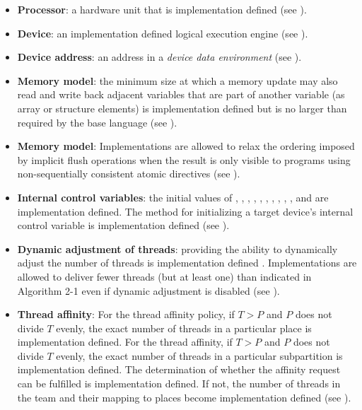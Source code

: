 \begin{itemize}
\item \textbf{Processor}: a hardware unit that is implementation defined (see 
). 

\item \textbf{Device}: an implementation defined logical execution engine (see 
). 

\item \textbf{Device address}: an address in a \emph{device data environment} (see ).

\item \textbf{Memory model}: the minimum size at which a memory update may also read and 
write back adjacent variables that are part of another variable (as array or structure 
elements) is implementation defined but is no larger than required by the base 
language (see ).

\item \textbf{Memory model}: Implementations are allowed to relax the ordering imposed by
implicit flush operations when the result is only visible to programs using 
non-sequentially consistent atomic directives (see ). 

\item \textbf{Internal control variables}: the initial values of 
, , , 
, , , 
, , 
, , and 
 are implementation defined.  The method for
initializing a target device's internal control variable is
implementation defined (see ).

\item \textbf{Dynamic adjustment of threads}: providing the ability to dynamically adjust the 
number of threads is implementation defined . Implementations are allowed to deliver 
fewer threads (but at least one) than indicated in Algorithm 2-1 even if dynamic 
adjustment is disabled (see ).

\item \textbf{Thread affinity}: For the  thread affinity
  policy, if $T > P$ and $P$ does not divide $T$ evenly, the exact
  number of threads in a particular place is implementation defined.
  For the  thread affinity, if $T > P$ and $P$ does not
  divide $T$ evenly, the exact number of threads in a particular
  subpartition is implementation defined.  The determination of
  whether the affinity request can be fulfilled is implementation
  defined.  If not, the number of threads in the team and their mapping
  to places become implementation defined (see
  ).


\end{itemize}
